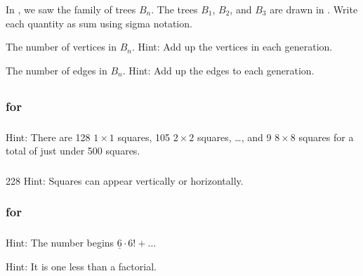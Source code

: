 \begin{exer}[\exerE] %
\label{exer_perfect_binary_trees_sigma}
    In  , we saw the family of trees $B_n$. The trees $B_1$, $B_2$, and $B_3$ are drawn in .  Write each quantity as sum using sigma notation.  
        \begin{exerpart}
            \item The number of vertices in $B_n$.  Hint: Add up the vertices in each generation.  
            \item The number of edges in $B_n$.  Hint: Add up the edges to each generation.
        \end{exerpart}
\end{exer}

\subsection{\answers}

\subsubsection{\answers for }

\subsubsection*{ \answers}
Hint: There are 128 $1 \times 1$ squares, 105 $2 \times 2$ squares, \ldots, and 9 $8 \times 8$ squares for a total of just under 500 squares.

\subsubsection*{ \answers}
228  Hint: Squares can appear vertically or horizontally.  

\subsubsection{\answers for  \subfactrep}

\subsubsection*{ \answers}
\begin{apart}
    \item Hint: The number begins $\underline{6} \cdot 6! +\ldots$
    \item Hint: It is one less than a factorial.
\end{apart}

